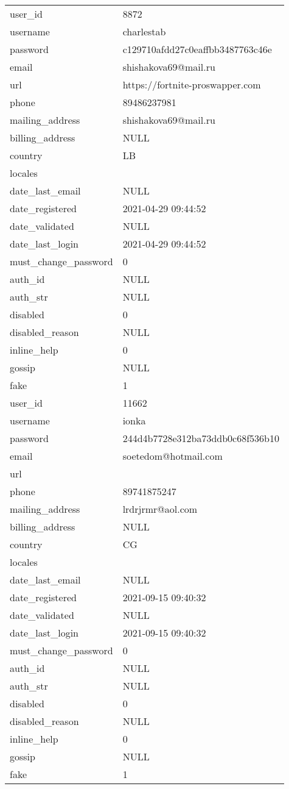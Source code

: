 \begin{longtable}{|l|l|}
    \hline
    user\_id & 8872 \\
    username & charlestab \\
    password & c129710afdd27c0eaffbb3487763c46e \\
    email & shishakova69@mail.ru \\
    url & https://fortnite-proswapper.com \\
    phone & 89486237981 \\
    mailing\_address & shishakova69@mail.ru \\
    billing\_address & NULL \\
    country & LB \\
    locales &  \\
    date\_last\_email & NULL \\
    date\_registered & 2021-04-29 09:44:52 \\
    date\_validated & NULL \\
    date\_last\_login & 2021-04-29 09:44:52 \\
    must\_change\_password & 0 \\
    auth\_id & NULL \\
    auth\_str & NULL \\
    disabled & 0 \\
    disabled\_reason & NULL \\
    inline\_help & 0 \\
    gossip & NULL \\
    fake & 1 \\

    \hline
    user\_id & 11662 \\
    username & ionka \\
    password & 244d4b7728e312ba73ddb0c68f536b10 \\
    email & soetedom@hotmail.com \\
    url &  \\
    phone & 89741875247 \\
    mailing\_address & lrdrjrmr@aol.com \\
    billing\_address & NULL \\
    country & CG \\
    locales &  \\
    date\_last\_email & NULL \\
    date\_registered & 2021-09-15 09:40:32 \\
    date\_validated & NULL \\
    date\_last\_login & 2021-09-15 09:40:32 \\
    must\_change\_password & 0 \\
    auth\_id & NULL \\
    auth\_str & NULL \\
    disabled & 0 \\
    disabled\_reason & NULL \\
    inline\_help & 0 \\
    gossip & NULL \\
    fake & 1 \\
\end{longtable}


